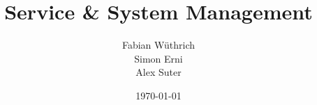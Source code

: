 \documentclass[11pt,a4paper]{scrreprt}
\begin{document}
\titlehead{Hochschule Luzern \\ 
	Technik \& Architektur}
\subject{Zusammenfassung}
\title{Service \& System Management}
\subtitle{}
\author{Fabian Wüthrich \\ 
	Simon Erni \\ 
	Alex Suter}
\date{\today}

\maketitle

\tableofcontents
\end{document}
